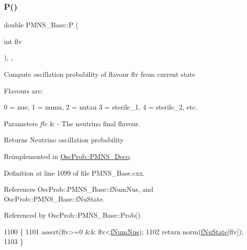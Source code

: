 \subsubsection{\texorpdfstring{P()}{P()}}
{\footnotesize\ttfamily double P\+M\+N\+S\+\_\+\+Base\+::P (\begin{DoxyParamCaption}\item[{int}]{flv }\end{DoxyParamCaption})\hspace{0.3cm}{\ttfamily [protected]}, {\ttfamily [virtual]}, {\ttfamily [inherited]}}

Compute oscillation probability of flavour flv from current state

Flavours are\+: 
\begin{DoxyPre}
  0 = nue, 1 = numu, 2 = nutau
  3 = sterile\_1, 4 = sterile\_2, etc.
\end{DoxyPre}
 
\begin{DoxyParams}{Parameters}
{\em flv} & -\/ The neutrino final flavour.\\
\hline
\end{DoxyParams}
\begin{DoxyReturn}{Returns}
Neutrino oscillation probability 
\end{DoxyReturn}


Reimplemented in \hyperlink{classOscProb_1_1PMNS__Deco_aa81f47ea36207b90a5feb9849060032d}{Osc\+Prob\+::\+P\+M\+N\+S\+\_\+\+Deco}.



Definition at line 1099 of file P\+M\+N\+S\+\_\+\+Base.\+cxx.



References Osc\+Prob\+::\+P\+M\+N\+S\+\_\+\+Base\+::f\+Num\+Nus, and Osc\+Prob\+::\+P\+M\+N\+S\+\_\+\+Base\+::f\+Nu\+State.



Referenced by Osc\+Prob\+::\+P\+M\+N\+S\+\_\+\+Base\+::\+Prob().


\begin{DoxyCode}
1100 \{
1101   assert(flv>=0 && flv<\hyperlink{classOscProb_1_1PMNS__Base_a24bb74bed63569dfe88b18fa6a08060e}{fNumNus});
1102   \textcolor{keywordflow}{return} norm(\hyperlink{classOscProb_1_1PMNS__Base_abf99f2339e3ee989600740b5d88063e8}{fNuState}[flv]);
1103 \}
\end{DoxyCode}
\mbox{\label{classOscProb_1_1PMNS__Base_aec5c399b93261f1962a4b7dbbb44b973}} 
